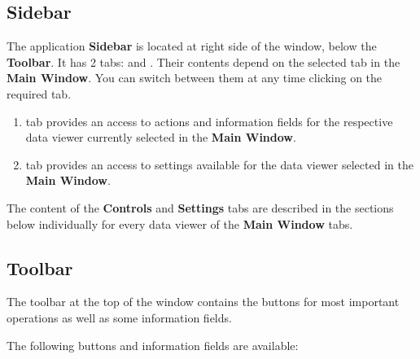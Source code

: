 \subsection{Sidebar}

The application \textbf{Sidebar} is located at right side of the window, below the \textbf{Toolbar}. It has 2 tabs:  and . Their contents depend on the selected tab in the \textbf{Main Window}. You can switch between them at any time clicking on the required tab.


\begin{enumerate}
	\item {} tab provides an access to actions and information fields for the respective data viewer currently selected in the \textbf{Main Window}.
	\item {} tab provides an access to settings available for the data viewer selected in the \textbf{Main Window}.
\end{enumerate}

The content of the \textbf{Controls} and \textbf{Settings} tabs are described in the sections below individually for every data viewer of the \textbf{Main Window} tabs.

\newpage
\subsection{Toolbar}

The toolbar at the top of the window contains the buttons for most important operations as well as some information fields.


The following buttons and information fields are available:

